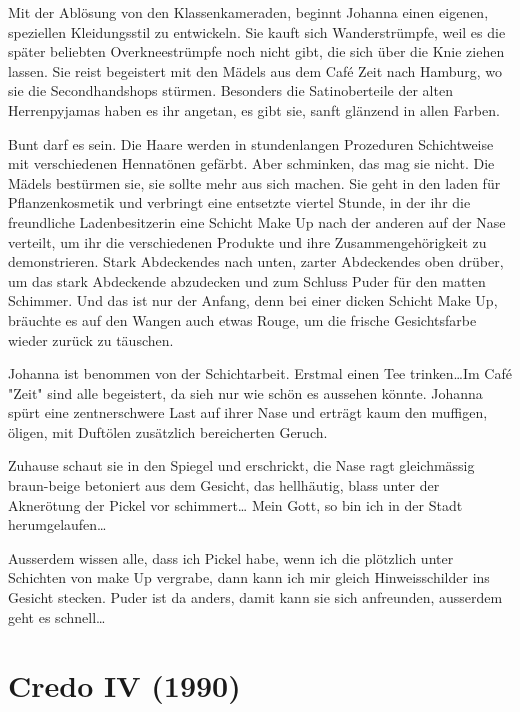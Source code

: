\documentclass[10pt,titlepage,a5paper]{book}
\begin{document}
Mit der Ablösung von den Klassenkameraden, beginnt Johanna einen eigenen, speziellen Kleidungsstil zu entwickeln. Sie kauft sich Wanderstrümpfe, weil es die später beliebten Overkneestrümpfe noch nicht gibt, die sich über die Knie ziehen lassen. Sie reist begeistert mit den Mädels aus dem Café Zeit nach Hamburg, wo sie die Secondhandshops stürmen. Besonders die Satinoberteile der alten Herrenpyjamas haben es ihr angetan, es gibt sie, sanft glänzend in allen Farben. 

Bunt darf es sein. Die Haare werden in stundenlangen Prozeduren Schichtweise mit verschiedenen Hennatönen gefärbt. Aber schminken, das mag sie nicht. Die Mädels bestürmen sie, sie sollte mehr aus sich machen. Sie geht in den laden für Pflanzenkosmetik und verbringt eine entsetzte viertel Stunde, in der ihr die freundliche Ladenbesitzerin eine Schicht Make Up nach der anderen auf der Nase verteilt, um ihr die verschiedenen Produkte und ihre Zusammengehörigkeit zu demonstrieren. Stark Abdeckendes nach unten, zarter Abdeckendes oben drüber, um das stark Abdeckende abzudecken und zum Schluss Puder für den matten Schimmer. Und das ist nur der Anfang, denn bei einer dicken Schicht Make Up, bräuchte es auf den Wangen auch etwas Rouge, um die frische Gesichtsfarbe wieder zurück zu täuschen. 

Johanna ist benommen von der Schichtarbeit. Erstmal einen Tee trinken\dots  Im Café "Zeit" sind alle begeistert, da sieh nur wie schön es aussehen könnte. Johanna spürt eine zentnerschwere Last auf ihrer Nase und erträgt kaum den muffigen, öligen, mit Duftölen zusätzlich bereicherten Geruch.

Zuhause schaut sie in den Spiegel und erschrickt, die Nase ragt gleichmässig braun-beige betoniert aus dem Gesicht, das hell\-häutig, blass unter der Aknerötung der Pickel vor schimmert\dots{} Mein Gott, so bin ich in der Stadt herumgelaufen\dots 

Ausserdem wissen alle, dass ich Pickel habe, wenn ich die plötzlich unter Schichten von make Up vergrabe, dann kann ich mir gleich Hinweisschilder ins Gesicht stecken. Puder ist da anders, damit kann sie sich anfreunden, ausserdem geht es schnell\dots 



\section*{Credo IV (1990)}
\end{document}
